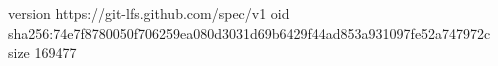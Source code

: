 version https://git-lfs.github.com/spec/v1
oid sha256:74e7f8780050f706259ea080d3031d69b6429f44ad853a931097fe52a747972c
size 169477
